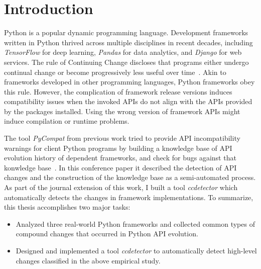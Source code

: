 \chapter{Introduction}
\label{chap:introduction}

Python is a popular dynamic programming language. Development frameworks written in Python thrived across multiple disciplines in recent decades, including \textit{TensorFlow} for deep learning, \textit{Pandas} for data analytics, and \textit{Django} for web services. The rule of Continuing Change discloses that programs either undergo continual change or become progressively less useful over time~\cite{evo-laws}. Akin to frameworks developed in other programming languages, Python frameworks obey this rule. However, the complication of framework release versions induces compatibility issues when the invoked APIs do not align with the APIs provided by the packages installed. Using the wrong version of framework APIs might induce compilation or runtime problems.

The tool \textit{PyCompat} from previous work tried to provide API incompatibility warnings for client Python programs by building a knowledge base of API evolution history of dependent frameworks, and check for bugs against that konwledge base~\cite{DBLP:conf/wcre/ZhangZWTLX20}. In this conference paper it described the detection of API changes and the construction of the knowledge base as a semi-automated process. As part of the journal extension of this work, I built a tool \textit{ccdetector} which automatically detects the changes in framework implementations.
To summarize, this thesis accomplishes two major tasks:

\begin{itemize}
  \item Analyzed three real-world Python frameworks and collected common types of compound changes that occurred in Python API evolution.
  \item Designed and implemented a tool \textit{ccdetector} to automatically detect high-level changes classified in the above empirical study.
\end{itemize}
